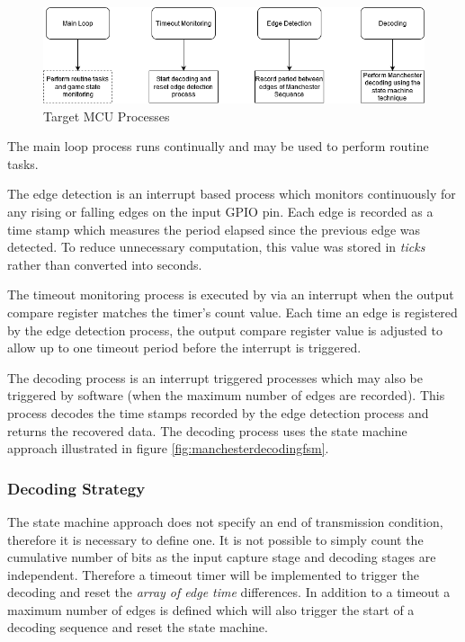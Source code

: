\begin{figure}[H]
	\centering
	\includegraphics[width=0.8\linewidth]{figures/design/target_software_overview.png}
	\caption{Target MCU Processes}
	\label{fig:target_software_overview}
\end{figure}

The main loop process runs continually and may be used to perform routine tasks.

The edge detection is an interrupt based process which monitors continuously for any rising or falling edges on the input GPIO pin. Each edge is recorded as a time stamp which measures the period elapsed since the previous edge was detected. To reduce unnecessary computation, this value was stored in \textit{ticks} rather than converted into seconds.

The timeout monitoring process is executed by via an interrupt when the output compare register matches the timer's count value. Each time an edge is registered by the edge detection process, the output compare register value is adjusted to allow up to one timeout period before the interrupt is triggered.

The decoding process is an interrupt triggered processes which may also be triggered by software (when the maximum number of edges are recorded). This process decodes the time stamps recorded by the edge detection process and returns the recovered data. The decoding process uses the state machine approach illustrated in figure \ref{fig:manchesterdecodingfsm}.

\subsubsection{Decoding Strategy}

The state machine approach does not specify an end of transmission condition, therefore it is necessary to define one. It is not possible to simply count the cumulative number of bits as the input capture stage and decoding stages are independent. Therefore a timeout timer will be implemented to trigger the decoding and reset the \textit{array of edge time} differences. In addition to a timeout a maximum number of edges is defined which will also trigger the start of a decoding sequence and reset the state machine.

